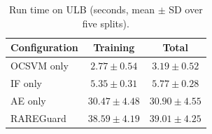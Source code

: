 \begin{table}[t]
\centering
\caption{Run time on ULB (seconds, mean $\pm$ SD over five splits).}
\label{tab:cost}
\begin{tabular}{lcc}
\toprule
Configuration & Training & Total \\
\midrule
OCSVM only & $2.77\pm0.54$ & $3.19\pm0.52$ \\
IF only & $5.35\pm0.31$ & $5.77\pm0.28$ \\
AE only & $30.47\pm4.48$ & $30.90\pm4.55$ \\
RAREGuard & $38.59\pm4.19$ & $39.01\pm4.25$ \\
\bottomrule
\end{tabular}
\end{table}
